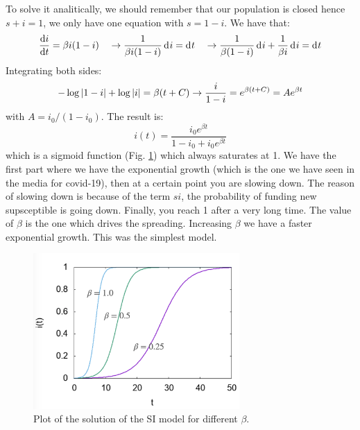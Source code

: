\documentclass[../main/main.tex]{subfiles}
\begin{document}
To solve it analitically, we should remember that our population is closed hence \( s+i=1 \), we only have one equation with \( s=1-i \).
We have that:
\begin{equation*}
  \dv{i}{t} = \beta i (1-i) \quad \rightarrow \frac{1}{\beta i (1-i)} \dd[]{i} = \dd[]{t} \quad \rightarrow \frac{1}{\beta (1-i)} \dd[]{i} + \frac{1}{\beta i} \dd[]{i} = \dd[]{t}
\end{equation*}
Integrating both sides:
\begin{equation*}
  - \log \abs{1-i} + \log \abs{i} = \beta (t+C) \rightarrow \frac{i}{1-i} = e^{\beta (t+C)} = A e^{\beta t}
\end{equation*}
with \( A = i_0/(1-i_0) \).
The result is:
\begin{equation}
  i(t) = \frac{i_0 e^{\beta t} }{1-i_0 + i_0 e^{\beta t} }
\end{equation}
which is a sigmoid function (Fig. \ref{fig:3_2}) which always saturates at 1. We have the first part where we have the exponential growth (which is the one we have seen in the media for covid-19), then at a certain point you are slowing down. The reason of slowing down is because of the term \( s i \), the probability of funding new supsceptible is going down. Finally, you reach 1 after a very long time. The value of \( \beta  \) is the one which drives the spreading. Increasing \( \beta  \) we have a faster exponential growth.
This was the simplest model.

\begin{figure}[h!]
\centering
\includegraphics[width=0.7\textwidth]{../lessons/image/03/2.png}
\caption{\label{fig:3_2} Plot of the solution of the SI model for different \( \beta  \).}
\end{figure}
\end{document}
